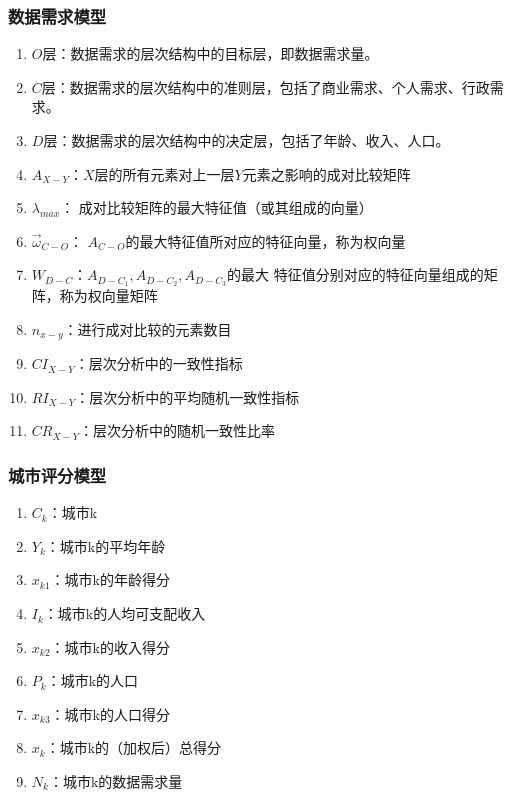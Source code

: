 \documentclass[UTF8,12pt]{ctexart}
\begin{document}
      \subsubsection{数据需求模型}
        \begin{enumerate}
            \item $O$层：数据需求的层次结构中的目标层，即数据需求量。
            \item $C$层：数据需求的层次结构中的准则层，包括了商业需求、个人需求、行政需求。
            \item $D$层：数据需求的层次结构中的决定层，包括了年龄、收入、人口。
            \item $A_{X-Y}$：$X$层的所有元素对上一层$Y$元素之影响的成对比较矩阵
            \item $\lambda _{max}$：
                成对比较矩阵的最大特征值（或其组成的向量）
            \item $\overrightarrow\omega _{C-O}$：
                $A_{C-O}$的最大特征值所对应的特征向量，称为权向量
            \item $W_{D-C}$：$A_{D-C_1},A_{D-C_2},A_{D-C_3}$的最大
                特征值分别对应的特征向量组成的矩阵，称为权向量矩阵
            \item $n_{x-y}$：进行成对比较的元素数目
            \item $CI_{X-Y}$：层次分析中的一致性指标
            \item $RI_{X-Y}$：层次分析中的平均随机一致性指标
            \item $CR_{X-Y}$：层次分析中的随机一致性比率
        \end{enumerate}
      
      \subsubsection{城市评分模型}
        \begin{enumerate}
            \item $C_k$：城市k
            \item $Y_k$：城市k的平均年龄
            \item $x_{k1}$：城市k的年龄得分
            \item $I_k$：城市k的人均可支配收入
            \item $x_{k2}$：城市k的收入得分
            \item $P_k$：城市k的人口
            \item $x_{k3}$：城市k的人口得分
            \item $x_k$：城市k的（加权后）总得分
            \item $N_k$：城市k的数据需求量
        \end{enumerate}
\end{document}
